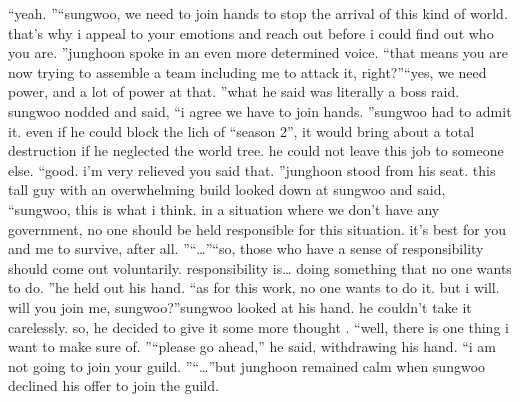 “yeah.
”“sungwoo, we need to join hands to stop the arrival of this kind of world.
 that’s why i appeal to your emotions and reach out before i could find out who you are.
”junghoon spoke in an even more determined voice.
“that means you are now trying to assemble a team including me to attack it, right?”“yes, we need power, and a lot of power at that.
”what he said was literally a boss raid.
sungwoo nodded and said, “i agree we have to join hands.
”sungwoo had to admit it.
 even if he could block the lich of “season 2”, it would bring about a total destruction if he neglected the world tree.
 he could not leave this job to someone else.
“good.
 i’m very relieved you said that.
”junghoon stood from his seat.
 this tall guy with an overwhelming build looked down at sungwoo and said, “sungwoo, this is what i think.
 in a situation where we don’t have any government, no one should be held responsible for this situation.
 it’s best for you and me to survive, after all.
”“…”“so, those who have a sense of responsibility should come out voluntarily.
 responsibility is… doing something that no one wants to do.
”he held out his hand.
“as for this work, no one wants to do it.
 but i will.
 will you join me, sungwoo?”sungwoo looked at his hand.
 he couldn’t take it carelessly.
 so, he decided to give it some more thought .
“well, there is one thing i want to make sure of.
”“please go ahead,” he said, withdrawing his hand.
“i am not going to join your guild.
”“…”but junghoon remained calm when sungwoo declined his offer to join the guild.

